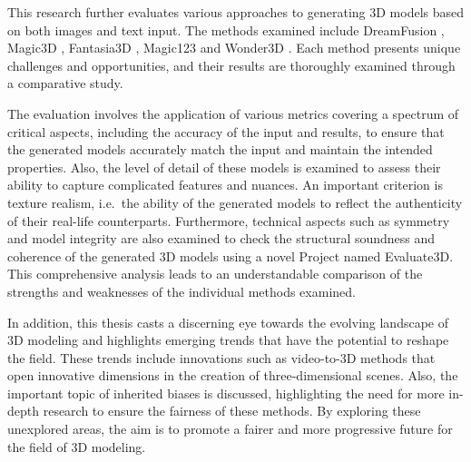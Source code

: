 This research further evaluates various approaches to generating 3D models based on both images and text input. The methods examined include DreamFusion \citep{pooleDreamfusion}, Magic3D \citep{lin2023magic3d}, Fantasia3D \citep{chen2023fantasia3d}, Magic123 \citep{qian2023magic123} and Wonder3D \citep{long2023wonder3d}. Each method presents unique challenges and opportunities, and their results are thoroughly examined through a comparative study. 

The evaluation involves the application of various metrics covering a spectrum of critical aspects, including the accuracy of the input and results, to ensure that the generated models accurately match the input and maintain the intended properties. Also, the level of detail of these models is examined to assess their ability to capture complicated features and nuances. An important criterion is texture realism, i.e.~the ability of the generated models to reflect the authenticity of their real-life counterparts. Furthermore, technical aspects such as symmetry and model integrity are also examined to check the structural soundness and coherence of the generated 3D models using a novel Project named Evaluate3D. This comprehensive analysis leads to an understandable comparison of the strengths and weaknesses of the individual methods examined.

In addition, this thesis casts a discerning eye towards the evolving landscape of 3D modeling and highlights emerging trends that have the potential to reshape the field. These trends include innovations such as video-to-3D methods that open innovative dimensions in the creation of three-dimensional scenes. Also, the important topic of inherited biases is discussed, highlighting the need for more in-depth research to ensure the fairness of these methods. By exploring these unexplored areas, the aim is to promote a fairer and more progressive future for the field of 3D modeling.